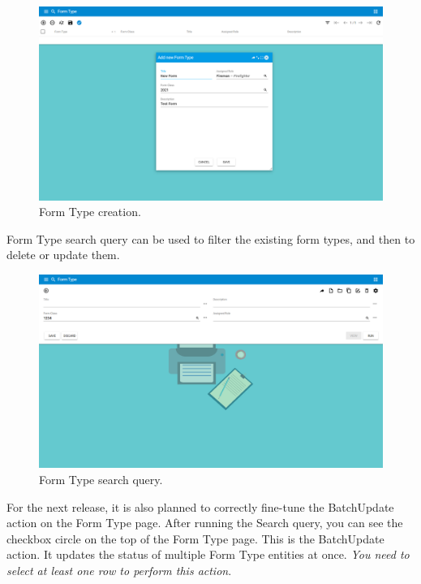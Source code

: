 \begin{figure}[!htbp]
\centering
\includegraphics[width=0.95\linewidth]{sections/forms/images/form_type_master.png}
\caption{Form Type creation.}\label{sections/forms/images/form_type_master}
\end{figure}

\newpage
Form Type search query can be used to filter the existing form types, and then to delete or update them. 
\begin{figure}[!htbp]
\centering
\includegraphics[width=0.95\linewidth]{sections/forms/images/form_type_centre.png}
\caption{Form Type search query.}\label{sections/forms/images/form_type_centre}
\end{figure}

For the next release, it is also planned to correctly fine-tune the BatchUpdate action on the Form Type page. After running the Search query, you can see the checkbox circle on the top of the Form Type page. This is the BatchUpdate action. It updates the status of multiple Form Type entities at once. \textit{You need to select at least one row to perform this action}.

